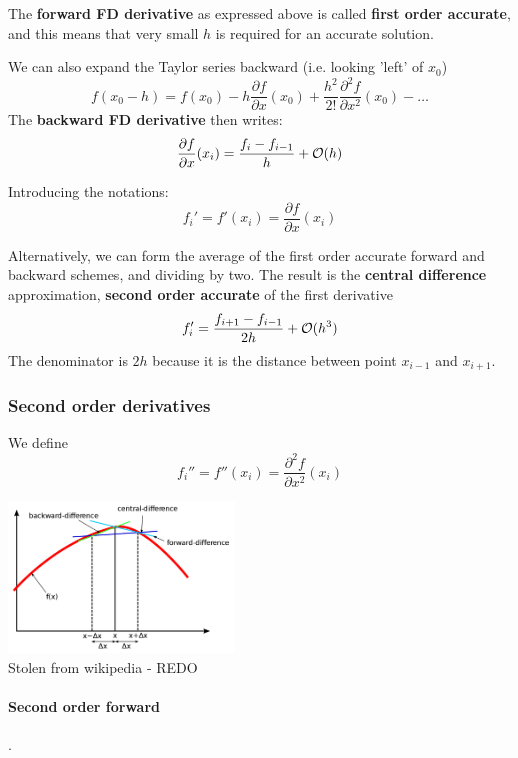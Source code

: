 The {\bf forward FD derivative} as expressed above is called {\bf first order accurate},
and this means that very small $h$ is required for an accurate solution.

We can also expand the Taylor series backward (i.e. looking 'left' of $x_0$)
\[
f(x_0-h)=f(x_0)-
h \frac{\partial f}{\partial x}(x_0)  + 
\frac{h^2}{2!} \frac{\partial^2 f}{\partial x^2}(x_0)  -
\dots 
\]
The {\bf backward FD derivative} then writes:
\[
\frac{\partial f}{\partial x}(x_i) = \frac{f_{i}-f_{i-1}}{h} + {\cal O}(h) 
\]

Introducing the notations:
\[
f_i'=f'(x_i)=\frac{\partial f}{\partial x} (x_i)
\]




Alternatively, we can form the average of the first order accurate forward and backward schemes,
and dividing by two.
The result is the {\bf central difference} approximation,
{\bf second order accurate} of the first derivative
\[
f_i' = \frac{f_{i+1}-f_{i-1}}{2h} + {\cal O}(h^3)
\]
The denominator is $2h$ because it is the distance between point $x_{i-1}$ and $x_{i+1}$.

\subsubsection{Second order derivatives}

We define 
\[
f_i''=f''(x_i) = \frac{\partial^2 f}{\partial x^2} (x_i)
\]

\begin{center}
\includegraphics[width=6cm]{images/fdm/fd1}\\
Stolen from wikipedia - REDO
\end{center}


\paragraph{Second order forward}. 

